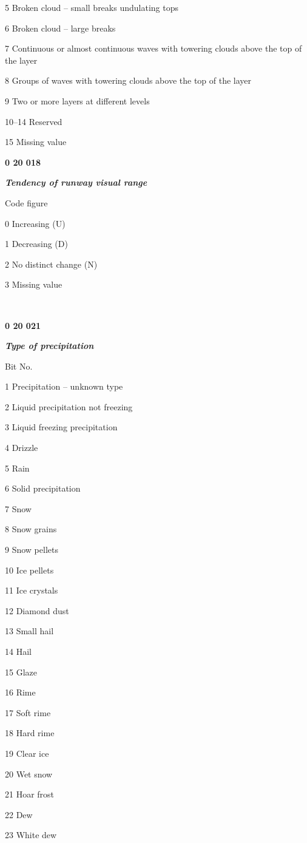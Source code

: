 5 Broken cloud -- small breaks undulating tops

6 Broken cloud -- large breaks

7 Continuous or almost continuous waves with towering clouds above the top of the layer

8 Groups of waves with towering clouds above the top of the layer

9 Two or more layers at different levels

10--14 Reserved

15 Missing value

\textbf{0 20 018}

\emph{\textbf{Tendency of runway visual range}}

Code figure

0 Increasing (U)

1 Decreasing (D)

2 No distinct change (N)

3 Missing value

\textbf{\\
}

\textbf{0 20 021}

\emph{\textbf{Type of precipitation}}

Bit No.

1 Precipitation -- unknown type

2 Liquid precipitation not freezing

3 Liquid freezing precipitation

4 Drizzle

5 Rain

6 Solid precipitation

7 Snow

8 Snow grains

9 Snow pellets

10 Ice pellets

11 Ice crystals

12 Diamond dust

13 Small hail

14 Hail

15 Glaze

16 Rime

17 Soft rime

18 Hard rime

19 Clear ice

20 Wet snow

21 Hoar frost

22 Dew

23 White dew

